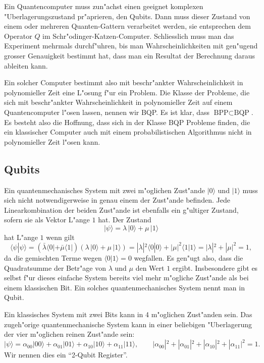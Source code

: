 Ein Quantencomputer muss zun"achst einen geeignet komplexen
"Uberlagerungszustand pr"aprieren, den Qubits. Dann muss dieser Zustand
von einem oder mehreren Quanten-Gattern verarbeitet werden, sie
entsprechen dem Operator $Q$ im Schr"odinger-Katzen-Computer.
Schliesslich muss man das Experiment mehrmals durchf"uhren, bis man
Wahrscheinlichkeiten mit gen"ugend grosser Genauigkeit bestimmt hat,
dass man ein Resultat der Berechnung daraus ableiten kann.

Ein solcher Computer bestimmt also mit beschr"ankter Wahrscheinlichkeit
in polynomieller Zeit eine L"osung f"ur ein Problem. Die
Klasse der Probleme, die sich mit beschr"ankter Wahrscheinlichkeit in
polynomieller Zeit auf einem Quantencomputer l"osen lassen, nennen wir
BQP.
Es ist klar, dass $\text{BPP}\subset\text{BQP}$.
Es besteht also die Hoffnung, dass sich in der Klasse BQP Probleme finden,
die ein klassischer Computer auch mit einem probabilistischen Algorithmus
nicht in polynomieller Zeit l"osen kann.

\subsection{Qubits}
Ein quantenmechanisches System mit zwei m"oglichen Zust"ande $|0\rangle$
und $|1\rangle$ muss sich nicht
notwendigerweise in genau einem der Zust"ande befinden.
Jede Linearkombination der beiden Zust"ande ist ebenfalls ein g"ultiger
Zustand, sofern sie als Vektor L"ange $1$ hat.
Der Zustand
\[
|\psi\rangle
=
\lambda \,|0\rangle + \mu\,|1\rangle
\]
hat L"ange $1$ wenn gilt
\[
\langle\psi|\psi\rangle
=
(
\bar\lambda
\langle 0|
+
\bar\mu
\langle 1|
)
(
\lambda \,|0\rangle + \mu\,|1\rangle
)
=
|\lambda|^2\langle 0|0\rangle + |\mu|^2\langle 1|1\rangle
=
|\lambda|^2+|\mu|^2
=
1
,
\]
da die gemischten Terme wegen $\langle 0|1\rangle=0$ wegfallen.
Es gen"ugt also, dass die Quadratsumme der Betr"age von $\lambda$ und $\mu$
den Wert $1$ ergibt.
Insbesondere gibt es selbst f"ur dieses einfache System bereits viel
mehr m"ogliche Zust"ande als bei einem klassischen Bit.
Ein solches quantenmechanisches System nennt man in Qubit.

Ein klassisches System mit zwei Bits kann in 4 m"oglichen Zust"anden sein.
Das zugeh"orige quantenmechanische System kann in einer beliebigen
"Uberlagerung der vier m"oglichen reinen Zust"ande sein:
\[
|\psi\rangle
=
\alpha_{00}|00\rangle
+
\alpha_{01}|01\rangle
+
\alpha_{10}|10\rangle
+
\alpha_{11}|11\rangle
,\qquad
|\alpha_{00}|^2
+
|\alpha_{01}|^2
+
|\alpha_{10}|^2
+
|\alpha_{11}|^2
=1.
\]
Wir nennen dies ein ``2-Qubit Register''.

